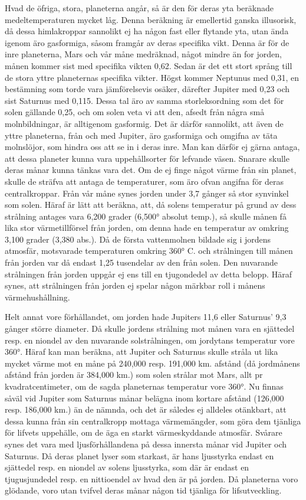 \documentclass[a4paper, 12pt, oneside, swedish]{article}
\begin{document}
Hvad de öfriga, stora, planeterna angår, så är den för deras yta beräknade medeltemperaturen mycket låg. Denna beräkning är emellertid ganska illusorisk, då dessa himlakroppar sannolikt ej ha någon fast eller flytande yta, utan ända igenom äro gasformiga, såsom framgår av deras specifika vikt. Denna är för de inre planeterna, Mars och vår måne medräknad, något mindre än for jorden, månen kommer sist med specifika vikten 0,62. Sedan är det ett stort språng till de stora yttre planeternas specifika vikter. Högst kommer Neptunus med 0,31, en bestämning som torde vara jämförelsevis osäker, därefter Jupiter med 0,23 och sist Saturnus med 0,115. Dessa tal äro av samma storleksordning som det för solen gällande 0,25, och om solen veta vi att den, afsedt från några små molnbildningar, är alltigenom gasformig. Det är därför sannolikt, att även de yttre planeterna, från och med Jupiter, äro gasformiga och omgifna av täta molnslöjor, som hindra oss att se in i deras inre. Man kan därför ej gärna antaga, att dessa planeter kunna vara uppehållsorter för lefvande väsen. Snarare skulle deras månar kunna tänkas vara det. Om de ej finge något värme från sin planet, skulle de sträfva att antaga de temperaturer, som äro ofvan angifna för deras centralkroppar. Från vår måne synes jorden under 3,7 gånger så stor synvinkel som solen. Häraf är lätt att beräkna, att, då solens temperatur på grund av dess strålning antages vara 6,200 grader (6,500° absolut temp.), så skulle månen få lika stor värmetillförsel från jorden, om denna hade en temperatur av omkring 3,100 grader (3,380 abs.). Då de första vattenmolnen bildade sig i jordens atmosfär, motsvarade temperaturen omkring 360° C. och strålningen till månen från jorden var då endast 1,25 tusendelar av den från solen. Den nuvarande strålningen från jorden uppgår ej ens till en tjugondedel av detta belopp. Häraf synes, att strålningen från jorden ej spelar någon märkbar roll i månens värmehushållning.

Helt annat vore förhållandet, om jorden hade Jupiters 11,6 eller Saturnus' 9,3 gånger större diameter. Då skulle jordens strålning mot månen vara en sjättedel resp. en niondel av den nuvarande solstrålningen, om jordytans temperatur vore 360°. Häraf kan man beräkna, att Jupiter och Saturnus skulle stråla ut lika mycket värme mot en måne på 240,000 resp. 191,000 km. afstånd (då jordmånens afstånd från jorden är 384,000 km.) som solen strålar mot Mars, allt pr kvadratcentimeter, om de sagda planeternas temperatur vore 360°. Nu finnas såväl vid Jupiter som Saturnus månar belägna inom kortare afstånd (126,000 resp. 186,000 km.) än de nämnda, och det är således ej alldeles otänkbart, att dessa kunna från sin centralkropp mottaga värmemängder, som göra dem tjänliga för lifvets uppehälle, om de äga en starkt värmeskyddande atmosfär. Svårare synes det vara med ljusförhållandena på dessa innersta månar vid Jupiter och Saturnus. Då deras planet lyser som starkast, är hans ljusstyrka endast en sjättedel resp. en niondel av solens ljusstyrka, som där är endast en tjugusjundedel resp. en nittioendel av hvad den är på jorden. Då planeterna voro glödande, voro utan tvifvel deras månar någon tid tjänliga för lifsutveckling.
\end{document}
